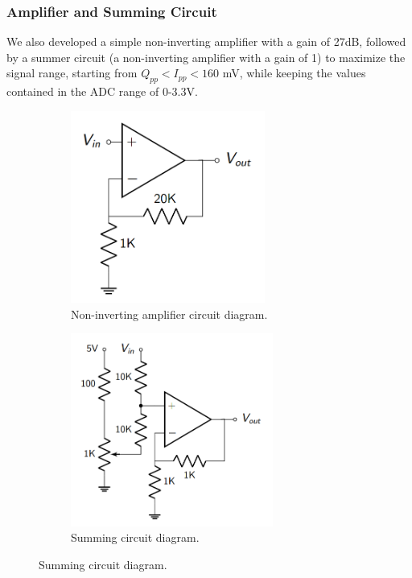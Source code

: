 \documentclass[12pt]{article}
\begin{document}
\subsubsection{Amplifier and Summing Circuit}
We also developed a simple non-inverting amplifier with a gain of 27dB, followed by a summer circuit (a non-inverting amplifier with a gain of 1) to maximize the signal range, starting from $Q_{pp} < I_{pp} < 160$ mV, while keeping the values contained in the ADC range of 0-3.3V. 
\begin{figure}[H]
\centering
\begin{subfigure}{0.48\textwidth}
\centering
        \includegraphics[width=0.7\textwidth]{amp.PNG}
        \caption{Non-inverting amplifier circuit diagram.}
        \label{amp}
    \end{subfigure}
\begin{subfigure}{0.48\textwidth}
\centering
        \includegraphics[width=0.73\textwidth]{summing.PNG}
        \caption{Summing circuit diagram.}
        \label{summing}
        \end{subfigure}
    \end{figure}
\end{document}
